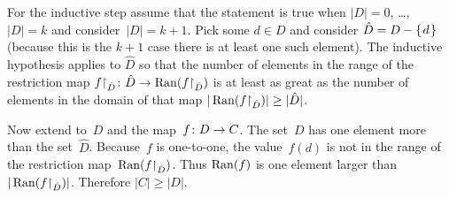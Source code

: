 \documentclass{ibl}  %
\begin{document}
\begin{problem}
\begin{exes}
\begin{answer}
  For the inductive step assume that the statement is true when $|D|=0$, 
  \ldots, $|D|=k$ and consider~$|D|=k+1$.
  Pick some $d\in D$ and consider 
  $\hat{D}=D-\mbox{$\{\hspace{0.1em}d\hspace{0.1em}\}$}$ (because this is the $k+1$ case there is at least
  one such element).
  The inductive hypothesis applies to $\hat{D}$ so that 
  the number of elements in the range of the restriction map 
  $\mbox{${f}\mathord\upharpoonright_{\hat{D}}\colon \hat{D}\to \operatorname{Ran}({f}\mathord\upharpoonright_{\hat{D}})$}$
  is at least as great as the number of elements in the domain of that map
  $|\operatorname{Ran}({f}\mathord\upharpoonright_{\hat{D}})|\geq |\hat{D}|$.

  Now extend to~$D$ and the map~$\mbox{$f\colon D\to C$}$.
  The set~$D$ has one element more than the set~$\hat{D}$.
  Because~$f$ is one-to-one, the value~$f(d)$ is not in 
  the range of the restriction map~$\operatorname{Ran}({f}\mathord\upharpoonright_{\hat{D}})$.
  Thus $\operatorname{Ran}(f)$ is one element larger than
  $|\operatorname{Ran}({f}\mathord\upharpoonright_{\hat{D}})|$.
  Therefore $|C|\geq|D|$.  
\end{answer}
\end{exes}
\end{problem}
\end{document}
